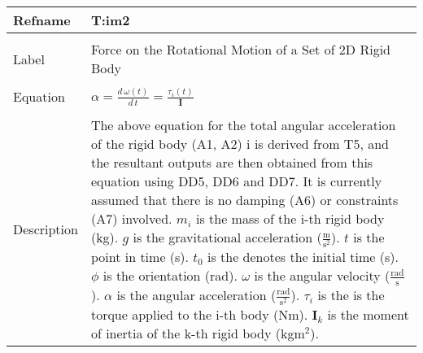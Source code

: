 \documentclass[12pt]{article}
\begin{document}
\noindent \begin{minipage}{\textwidth}
\begin{tabular}{p{} p{}}
\toprule \textbf{Refname} & \textbf{T:im2}
\label{T:im2}
\\ \midrule \\
Label & Force on the Rotational Motion of a Set of 2D Rigid Body
\\ \midrule \\
Equation & $\alpha{}=\frac{d\,\omega{}\left(t\right)}{d\,t}=\frac{{\tau{}_{i}}\left(t\right)}{\mathbf{I}}$
\\ \midrule \\
Description & The above equation for the total angular acceleration of the rigid body (A1, A2) i is derived from T5, and the resultant outputs are then obtained from this equation using DD5, DD6 and DD7. It is currently assumed that there is no damping (A6) or constraints (A7) involved. ${m_{i}}$ is the mass of the i-th rigid body (kg). $g$ is the gravitational acceleration ($\frac{\text{m}}{\text{s}^{2}}$). $t$ is the point in time (s). ${t_{0}}$ is the denotes the initial time (s). $\phi{}$ is the orientation (rad). $\omega{}$ is the angular velocity ($\frac{\text{rad}}{\text{s}}$). $\alpha{}$ is the angular acceleration ($\frac{\text{rad}}{\text{s}^{2}}$). ${\tau{}_{i}}$ is the is the torque applied to the i-th body (Nm). ${\mathbf{I}_{k}}$ is the moment of inertia of the k-th rigid body (kg$\text{m}^{2}$).
\\ \bottomrule \end{tabular}
\end{minipage}\\
~\newline
\end{document}
